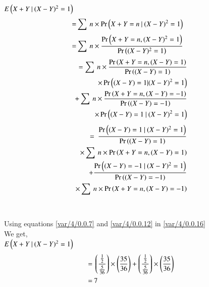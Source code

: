 $E\left(X+Y\:|\:(X-Y)^2=1\right)$
\begin{align}
    =&\sum\:n\times\Pr\left(X+Y=n\:|\:(X-Y)^2=1\right)
\end{align}
\begin{align}
    =&\sum\:n\times\frac{\Pr\left(X+Y=n,(X-Y)^2=1\right)}{\Pr\left((X-Y)^2=1\right)}
\end{align}
\begin{align}
    \begin{split}
        =\sum\:n\times\frac{\Pr\brak{X+Y=n,(X-Y)=1}}{\Pr\brak{(X-Y)=1}}
        \bigskip\\
        \times\Pr\brak{(X-Y)=1|(X-Y)^2=1}
        \bigskip\\
        +\sum\:n\times\frac{\Pr\brak{X+Y=n,(X-Y)=-1}}{\Pr\brak{(X-Y)=-1}}
        \bigskip\\
        \times\Pr\brak{(X-Y)=1\:|\:(X-Y)^2=1}
    \end{split}
\end{align}
\begin{align}
    \begin{split}
        =\:\frac{\Pr\brak{(X-Y)=1\:|\:(X-Y)^2=1}}{\Pr\brak{(X-Y)=1}}
        \bigskip\\
        \times\sum\:n\times\Pr\brak{X+Y=n,(X-Y)=1}
        \bigskip\\
        +\frac{\Pr\brak{(X-Y)=-1\:|\:(X-Y)^2=1}}{\Pr\brak{(X-Y)=-1}}
        \bigskip\\
        \times\sum\:n\times\Pr\brak{X+Y=n,(X-Y)=-1}\label{var/4/0.0.16}
    \end{split}
\end{align}
\newline\\\\
Using equations \eqref{var/4/0.0.7} and \eqref{var/4/0.0.12} in \eqref{var/4/0.0.16}\\
We get,\\
\newline
$E\left(X+Y\:|\:(X-Y)^2=1\right)$
\begin{align}
    =&\:\left(\frac{\frac{1}{2}}{\frac{5}{36}}\right)\times\left(\frac{35}{36}\right)+\left(\frac{\frac{1}{2}}{\frac{5}{36}}\right)\times\left(\frac{35}{36}\right)\\
    =&\:7
\end{align}
